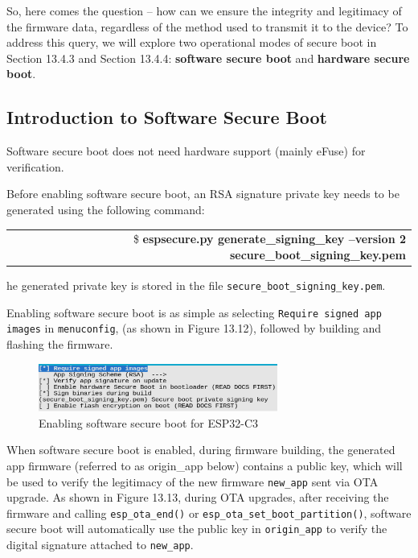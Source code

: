 \documentclass[a4paper,12pt,openany]{book}
\renewcommand{\ttfamily}{\fontfamily{pcr}\selectfont}
\renewcommand{\arraystretch}{1}
\newenvironment{codebloc}{ %
    \ttfamily\footnotesize
    \renewcommand{\arraystretch}{1}
}
\newcommand{\note}[2][NOTE]{ %
\vspace{6pt}
\begin{tabular}{b{\textwidth}}
\hline
\fontfamily{phv}\selectfont \textbf{#1}\\
\leftskip 1em #2\\
\hline
\end{tabular}
}
\begin{document}
So, here comes the question – how can we ensure the integrity and legitimacy of the firmware data, regardless of the method used to transmit it to the device? To address this query, we will explore two operational modes of secure boot in Section 13.4.3 and Section 13.4.4: \textbf{software secure boot} and \textbf{hardware secure boot}.


\subsection{Introduction to Software Secure Boot}
Software secure boot does not need hardware support (mainly eFuse) for verification.

Before enabling software secure boot, an RSA signature private key needs to be generated using the following command:

\begin{codebloc}
\begin{tabular}{d}
\$ \textbf{espsecure.py generate\_signing\_key --version 2 secure\_boot\_signing\_key.pem}
\end{tabular}
\end{codebloc}

The generated private key is stored in the file \verb|secure_boot_signing_key.pem|.

Enabling software secure boot is as simple as selecting \verb|Require signed app images| in \verb|menuconfig|, (as shown in Figure 13.12), followed by building and flashing the firmware.

\begin{figure}[!h]
    \centering
    \includegraphics[width=0.7\textwidth]{D13Z/13-12}
    \caption{Enabling software secure boot for ESP32-C3}
\end{figure}

When software secure boot is enabled, during firmware building, the generated app firmware (referred to as origin\_app below) contains a public key, which will be used to verify the legitimacy of the new firmware \verb|new_app| sent via OTA upgrade. As shown in Figure 13.13, during OTA upgrades, after receiving the firmware and calling \verb|esp_ota_end()| or \verb|esp_ota_set_boot_partition()|, software secure boot will automatically use the public key in \verb|origin_app| to verify the digital signature attached to \verb|new_app|.
\end{document}
